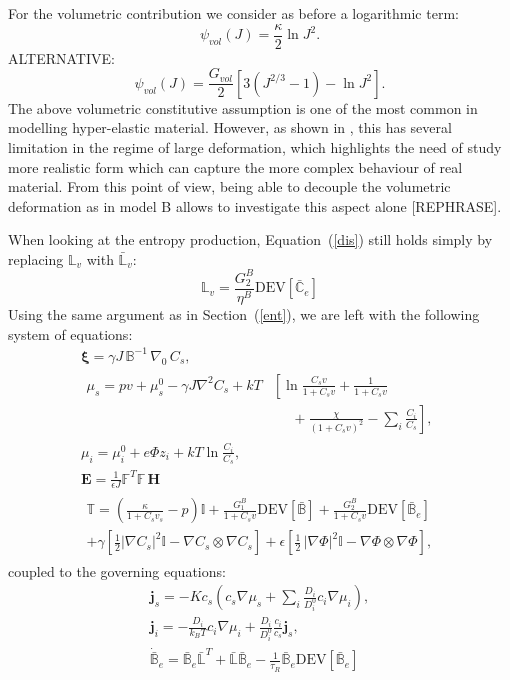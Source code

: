 \documentclass[runningheads]{llncs}
\newcommand{\F}{\ensuremath{\mathbb{F}}}
\newcommand{\B}{\ensuremath{\mathbb{B}}}
\newcommand{\LL}{\ensuremath{\mathbb{L}}}
\begin{document}
For the volumetric contribution we consider as before a logarithmic term:
\begin{equation}
\psi_{vol}(J) = \frac{\kappa}{2} \ln J^2. \label{psivol}
\end{equation}
ALTERNATIVE:
\begin{equation}
\psi_{vol}(J) = \frac{G_{vol}}{2}\left[3(J^{2/3}-1) -\ln J^2\right].
\end{equation}
The above volumetric constitutive assumption is one of the most common in modelling hyper-elastic material. However, as shown in \cite{vol}, this has several limitation in the regime of large deformation, which highlights the need of study more realistic form which can capture the more complex behaviour of real material. From this point of view, being able to decouple the volumetric deformation as in model B allows to investigate this aspect alone [REPHRASE].

When looking at the entropy production, Equation~(\ref{dis}) still holds simply by replacing $\LL_v$ with $\bar{\LL}_v$:
\begin{equation}
\LL_v = \frac{G^B_2}{\eta^B}\text{DEV}[\bar{\mathbb{C}}_e]\label{Lv2}
\end{equation}
 Using the same argument as in Section~(\ref{ent}), we are left with the following system of equations:
\begin{gather}
\boldsymbol{\xi} = \gamma J \,\mathbb{B}^{-1} \,\nabla_0 \,C_s,\label{sys1B}\\[2mm]
\begin{aligned}
\mu_s = p v + \mu_s^0 - \gamma J \nabla^2 C_s + kT&\left[\ln \frac{C_s v}{1+C_s v} + \frac{1}{1+C_sv}\right.\\
&\left.\ \ \ \ \ \ +\frac{\chi}{(1+C_s v)^2}-\sum_i \frac{C_i}{C_s}\right], 
\end{aligned}\\[2.5mm]
\mu_i = \mu^0_i + e\Phi z_i + kT \ln \frac{C_i}{C_s},\\
\mathbf{E} = \frac{1}{\epsilon J} \F^T \F\, \mathbf{H}\, \\[3mm]
\begin{aligned}
\mathbb{T}= \left(\frac{\kappa}{1+C_sv_s}-p\right) \mathbb{I} + \frac{G^B_1}{1+C_sv}\text{DEV}[\bar{\B}] + \frac{G^B_2}{1+C_sv}\text{DEV}[\bar{\B}_e]\\
+ \gamma \left[\frac{1}{2} |\nabla C_s|^2\mathbb{I} - \nabla C_s \otimes \nabla C_s\right]+ \epsilon \left[\frac{1}{2} \,|\nabla \Phi|^2\mathbb{I} -\nabla \Phi \otimes \nabla \Phi\right],\label{sys2B}
\end{aligned}
\end{gather}
coupled to the governing equations:
\begin{gather}
\mathbf{j}_s = -K c_s \left(c_s\nabla \mu_s +\sum_i \frac{D_i}{D^0_i} c_i \nabla \mu_i\right),\\
\mathbf{j}_i = - \frac{D_i}{k_B T}c_i\nabla \mu_i + \frac{D_i}{D^0_i} \frac{c_i}{c_s} \mathbf{j}_s, \\
\dot{\bar{\B}}_e = \bar{\B}_e \bar{\LL}^T +\bar{\LL} \bar{\B}_e -\frac{1}{\tau_R} \bar{\B}_e \text{DEV}\left[\bar{\B}_e\right]\label{BeB}
\end{gather}
\end{document}

